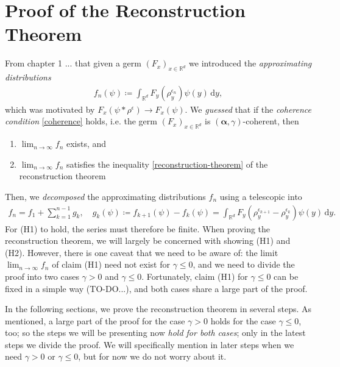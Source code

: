 
\chapter{Proof of the Reconstruction Theorem}\label{chapter:general-proof}

From chapter 1 ... that given a germ $(F_x)_{x \in \mathbb{R}^d}$ we introduced the \emph{approximating distributions} 
\begin{align*}
    f_n(\psi) \coloneqq \int_{\mathbb{R}^d} F_y(\rho_y^{\epsilon_n}) \psi(y) \, \mathrm{d}y \tag{Approximating distributions},
\end{align*}
which was motivated by $F_x(\psi * \rho^\epsilon) \to F_x(\psi)$. We \emph{guessed} that if the \emph{coherence condition} \eqref{coherence} holds, i.e. the germ $(F_x)_{x \in \mathbb{R}^d}$ is $(\bm \alpha, \gamma)$-coherent, then
\begin{enumerate}[label=(H\arabic*)]
    \item $\lim_{n \to \infty}f_n$ exists, and
    \item  $\lim_{n \to \infty}f_n$ satisfies the inequality \eqref{reconstruction-theorem} of the reconstruction theorem
 \end{enumerate}
 Then, we \emph{decomposed} the approximating distributions $f_n$ using a telescopic into 
 \begin{align*}
    f_n = f_1 + \sum^{n-1}_{k=1}
    g_k, \quad g_k(\psi) \coloneqq f_{k+1}(\psi) - f_k(\psi) = \int_{\mathbb{R}^d} F_y(\rho_y^{\epsilon_{k+1}} - \rho_y^{\epsilon_k}) \psi(y)\, \mathrm{d}y.
 \end{align*}
For (H1) to hold, the series must therefore be finite. When proving the reconstruction theorem, we will largely be concerned with showing (H1) and (H2). However, there is one caveat that we need to be aware of: the limit $\lim_{n \to \infty}f_n$ of claim (H1) need not exist for $\gamma \leq 0$, and we need to divide the proof into two cases $\gamma >0$ and $\gamma \leq 0$. Fortunately, claim (H1) for $\gamma \leq 0$ can be fixed in a simple way (TO-DO...), and both cases share a large part of the proof. 

In the following sections, we prove the reconstruction theorem in several steps. As mentioned, a large part of the proof for the case $\gamma > 0$ holds for the case $\gamma \leq 0$, too; so the steps we will be presenting now \emph{hold for both cases}; only in the latest steps we divide the proof. We will specifically mention in later steps when we need $\gamma > 0$ or $\gamma\leq 0$, but for now we do not worry about it.

